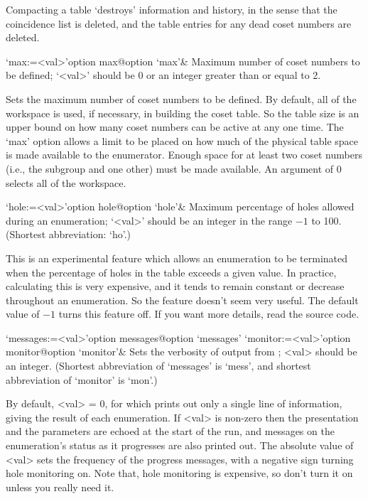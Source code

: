Compacting a table \lq{}destroys'  information  and  history,  in  the
sense that the coincidence list is deleted, and the table entries  for
any dead coset numbers are deleted.

\>`max:=<val>'{option max}@{option `max'}&
Maximum number of coset numbers to be defined;
`<val>' should be $0$ or an integer greater than or equal to 2.

Sets the maximum  number of coset numbers to  be defined.  By default,
all  of the workspace  is used,  if necessary,  in building  the coset
table.  So the table size is  an upper bound on how many coset numbers
can be active at any one time.   The `max' option allows a limit to be
placed on  how much of the  physical table space is  made available to
the enumerator.   Enough space for  at least two coset  numbers (i.e.,
the subgroup and one other) must  be made available.  An argument of 0
selects all of the workspace.

\>`hole:=<val>'{option hole}@{option `hole'}&
Maximum percentage of holes allowed during an enumeration;
`<val>' should be an integer in the range $-1$ to 100.
(Shortest abbreviation: `ho'.)

This is an experimental feature which  allows  an  enumeration  to  be
terminated when the percentage of holes in the table exceeds  a  given
value. In practice, calculating this is very expensive, and  it  tends
to remain constant or  decrease  throughout  an  enumeration.  So  the
feature doesn't seem very useful. The default value of $-1$ turns this
feature off. If you want more details, read the source code.

\enditems


\beginitems

\>`messages:=<val>'{option messages}@{option `messages'}
\>`monitor:=<val>'{option monitor}@{option `monitor'}&
Sets the verbosity of output from {\ACE}; <val> should be an integer.
(Shortest  abbreviation  of  `messages'  is   `mess',   and   shortest
abbreviation of `monitor' is `mon'.)

By default, <val> = 0, for which {\ACE} prints out only a single  line
of information, giving the result of each  enumeration.  If  <val>  is
non-zero then the presentation and the parameters are  echoed  at  the
start of the run, and messages  on  the  enumeration's  status  as  it
progresses are also printed out. The absolute value of <val> sets  the
frequency of the progress messages, with a negative sign turning  hole
monitoring on. Note that, hole monitoring is expensive, so don't  turn
it on unless you really need it.

